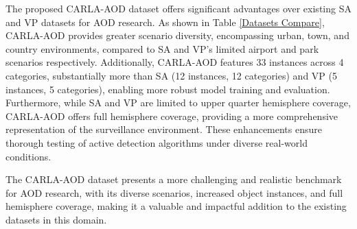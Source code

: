 \documentclass[lettersize,journal]{IEEEtran}
\begin{document}
The proposed CARLA-AOD dataset offers significant advantages over existing SA and VP datasets for AOD research. As shown in Table \ref{Datasets Compare}, CARLA-AOD provides greater scenario diversity, encompassing urban, town, and country environments, compared to SA and VP's limited airport and park scenarios respectively. Additionally, CARLA-AOD features 33 instances across 4 categories, substantially more than SA (12 instances, 12 categories) and VP (5 instances, 5 categories), enabling more robust model training and evaluation. Furthermore, while SA and VP are limited to upper quarter hemisphere coverage, CARLA-AOD offers full hemisphere coverage, providing a more comprehensive representation of the surveillance environment. These enhancements ensure thorough testing of active detection algorithms under diverse real-world conditions.

The CARLA-AOD dataset presents a more challenging and realistic benchmark for AOD research, with its diverse scenarios, increased object instances, and full hemisphere coverage, making it a valuable and impactful addition to the existing datasets in this domain. 

\begin{table}[!t]
\renewcommand{\arraystretch}{1.5}
\caption{Comparison of Active Object Detection Datasets.}
\label{Datasets Compare}
\centering
{}
\end{table}
\end{document}
